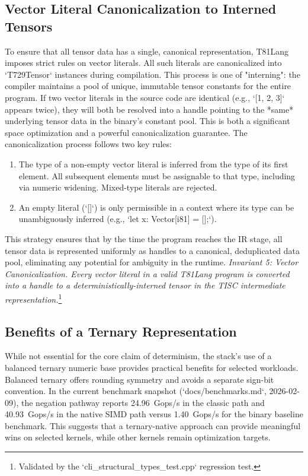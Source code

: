 \documentclass[sigconf, 10pt]{acmart}
\begin{document}
\subsection{Vector Literal Canonicalization to Interned Tensors}
To ensure that all tensor data has a single, canonical representation, T81Lang imposes strict rules on vector literals. All such literals are canonicalized into `T729Tensor` instances during compilation. This process is one of "interning": the compiler maintains a pool of unique, immutable tensor constants for the entire program. If two vector literals in the source code are identical (e.g., `[1, 2, 3]` appears twice), they will both be resolved into a handle pointing to the *same* underlying tensor data in the binary's constant pool. This is both a significant space optimization and a powerful canonicalization guarantee.
The canonicalization process follows two key rules:
\begin{enumerate}
\item The type of a non-empty vector literal is inferred from the type of its first element. All subsequent elements must be assignable to that type, including via numeric widening. Mixed-type literals are rejected.
\item An empty literal (`[]`) is only permissible in a context where its type can be unambiguously inferred (e.g., `let x: Vector[i81] = [];`).
\end{enumerate}
This strategy ensures that by the time the program reaches the IR stage, all tensor data is represented uniformly as handles to a canonical, deduplicated data pool, eliminating any potential for ambiguity in the runtime.
\textit{Invariant 5: Vector Canonicalization. Every vector literal in a valid T81Lang program is converted into a handle to a deterministically-interned tensor in the TISC intermediate representation.}\footnote{Validated by the `cli_structural_types_test.cpp` regression test.}
\subsection{Benefits of a Ternary Representation}
While not essential for the core claim of determinism, the stack's use of a balanced ternary numeric base provides practical benefits for selected workloads. Balanced ternary offers rounding symmetry and avoids a separate sign-bit convention. In the current benchmark snapshot (`docs/benchmarks.md`, 2026-02-09), the negation pathway reports 24.96~Gops/s in the classic path and 40.93~Gops/s in the native SIMD path versus 1.40~Gops/s for the binary baseline benchmark. This suggests that a ternary-native approach can provide meaningful wins on selected kernels, while other kernels remain optimization targets.
\end{document}
